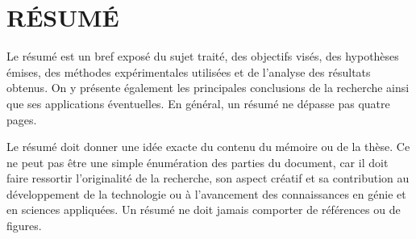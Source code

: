 %
\chapter*{RÉSUMÉ}\thispagestyle{headings}

Le résumé est un bref exposé du sujet traité, des objectifs visés,
des hypothèses émises, des méthodes expérimentales utilisées et de
l'analyse des résultats obtenus. On y présente également les
principales conclusions de la recherche ainsi que ses applications
éventuelles. En général, un résumé ne dépasse pas quatre pages.

Le résumé doit donner une idée exacte du contenu du mémoire ou de la thèse. Ce ne
peut pas être une simple énumération des parties du document, car il
doit faire ressortir l'originalité de la recherche, son aspect
créatif et sa contribution au développement de la technologie ou à
l'avancement des connaissances en génie et en sciences appliquées.
Un résumé ne doit jamais comporter de références ou de figures.
